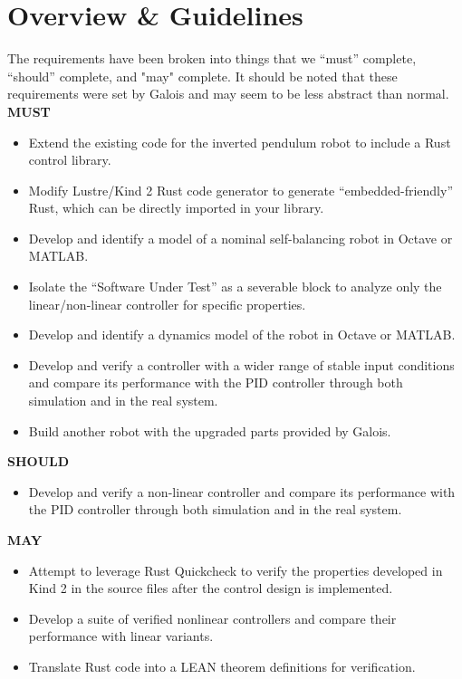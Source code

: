 \documentclass[a4paper,12pt]{article}
\begin{document}
\section{Overview \& Guidelines}
The requirements have been broken into things that we “must” complete, “should” complete, and "may" complete. It should be noted that these requirements were set by Galois and may seem to be less abstract than normal.\\

\textbf{MUST}
\begin{itemize}
    \item Extend the existing code for the inverted pendulum robot to include a Rust control library.
    \item Modify Lustre/Kind 2 Rust code generator to generate “embedded-friendly” Rust, which can be directly imported in your library.
    \item Develop and identify a model of a nominal self-balancing robot in Octave or MATLAB.
    \item Isolate the “Software Under Test” as a severable block to analyze only the linear/non-linear controller for specific properties.
    \item Develop and identify a dynamics model of the robot in Octave or MATLAB.
    \item Develop and verify a controller with a wider range of stable input conditions and compare its performance with the PID controller through both simulation and in the real system.
    \item Build another robot with the upgraded parts provided by Galois.
\end{itemize}
\textbf{SHOULD}
\begin{itemize}
    \item Develop and verify a non-linear controller and compare its performance with the PID controller through both simulation and in the real system.
\end{itemize}
\textbf{MAY}
\begin{itemize}
    \item Attempt to leverage Rust Quickcheck to verify the properties developed in Kind 2 in the source files after the control design is implemented.
    \item Develop a suite of verified nonlinear controllers and compare their performance with linear variants.
    \item Translate Rust code into a LEAN theorem definitions for verification.
\end{itemize}
\end{document}
